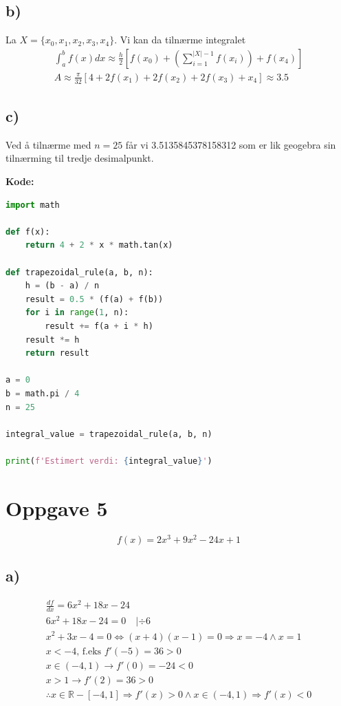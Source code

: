 \documentclass[12pt]{article}
\begin{document}
\subsection*{b)}
La \(X = \{x_0, x_1, x_2, x_3, x_4\}\). Vi kan da tilnærme integralet 
\begin{gather*}
  \displaystyle\int_{a}^{b}f(x)dx \approx 
  \frac{h}{2} [f(x_0) 
  + (\displaystyle\sum_{i = 1}^{|X| - 1} f(x_i)) +
  f(x_4) ] \\ 
  \boxed{A \approx \frac{\pi}{32}[4+2f(x_1)+2f(x_2)+2f(x_3)+x_4] \approx 3.5}
\end{gather*}

\break
\subsection*{c)}
Ved å tilnærme med \(n=25\) får vi 3.5135845378158312 som er lik geogebra sin 
tilnærming til tredje desimalpunkt.

\noindent
\textbf{Kode: }
\begin{lstlisting}[language=Python]
import math

def f(x):
    return 4 + 2 * x * math.tan(x)

def trapezoidal_rule(a, b, n):
    h = (b - a) / n
    result = 0.5 * (f(a) + f(b))  
    for i in range(1, n):
        result += f(a + i * h) 
    result *= h  
    return result

a = 0
b = math.pi / 4
n = 25

integral_value = trapezoidal_rule(a, b, n)

print(f'Estimert verdi: {integral_value}')
\end{lstlisting}

\break 
\section*{Oppgave 5}
\[f(x)=2x^3+9x^2-24x+1\]

\subsection*{a)}
\begin{gather*}
  \frac{df}{dx} = 6x^2+18x-24 \\ 
  6x^2 + 18x - 24 = 0 \quad | \div 6 \\ 
  x^2 + 3x - 4 = 0 \Leftrightarrow (x+4)(x-1) = 0 \Rightarrow x = -4 \land x = 1 \\ 
  x < -4 \text{, f.eks } f'(-5)=36 > 0 \\ 
  x \in (-4,1) \rightarrow f'(0)= -24 < 0 \\ 
  x > 1 \rightarrow f'(2) = 36 > 0 \\ 
  \therefore x \in \mathbb R - [-4,1] \Rightarrow f'(x) > 0 
  \land x \in (-4,1) \Rightarrow f'(x) < 0
\end{gather*}
\end{document}
